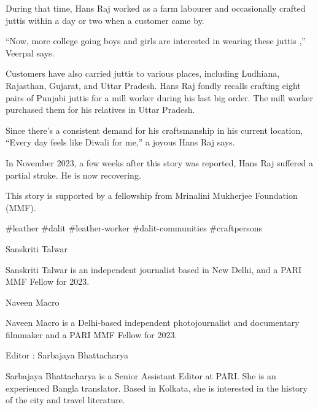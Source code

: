 \documentclass[
]{interact}
\begin{document}
During that time, Hans Raj worked as a farm labourer and occasionally
crafted juttis within a day or two when a customer came by.

``Now, more college going boys and girls are interested in wearing these
juttis ,'' Veerpal says.

Customers have also carried juttis to various places, including
Ludhiana, Rajasthan, Gujarat, and Uttar Pradesh. Hans Raj fondly recalls
crafting eight pairs of Punjabi juttis for a mill worker during his last
big order. The mill worker purchased them for his relatives in Uttar
Pradesh.

Since there's a consistent demand for his craftsmanship in his current
location, ``Every day feels like Diwali for me,'' a joyous Hans Raj
says.

In November 2023, a few weeks after this story was reported, Hans Raj
suffered a partial stroke. He is now recovering.

This story is supported by a fellowship from Mrinalini Mukherjee
Foundation (MMF).

\#leather \#dalit \#leather-worker \#dalit-communities \#craftpersons

Sanskriti Talwar

Sanskriti Talwar is an independent journalist based in New Delhi, and a
PARI MMF Fellow for 2023.

Naveen Macro

Naveen Macro is a Delhi-based independent photojournalist and
documentary filmmaker and a PARI MMF Fellow for 2023.

Editor : Sarbajaya Bhattacharya

Sarbajaya Bhattacharya is a Senior Assistant Editor at PARI. She is an
experienced Bangla translator. Based in Kolkata, she is interested in
the history of the city and travel literature.
\end{document}
